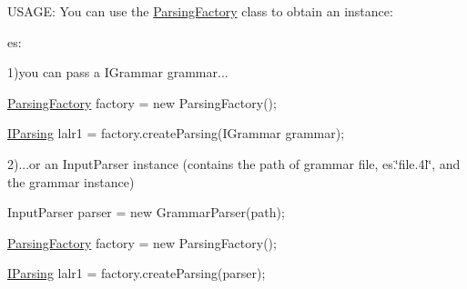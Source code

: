 U\-S\-A\-G\-E\-: You can use the \hyperlink{classcontext_free_1_1parser_1_1_parsing_factory}{Parsing\-Factory} class to obtain an instance\-:\par
 es\-:\par
 1)you can pass a I\-Grammar grammar...\par
 \hyperlink{classcontext_free_1_1parser_1_1_parsing_factory}{Parsing\-Factory} factory = new Parsing\-Factory();\par
 \hyperlink{interfacecontext_free_1_1parser_1_1_i_parsing}{I\-Parsing} lalr1 = factory.\-create\-Parsing(\-I\-Grammar grammar);\par
 \par
 2)...or an Input\-Parser instance (contains the path of grammar file, es.\char`\"{}file.\-4l\char`\"{}, and the grammar instance)\par


Input\-Parser parser = new Grammar\-Parser(path);\par
 \hyperlink{classcontext_free_1_1parser_1_1_parsing_factory}{Parsing\-Factory} factory = new Parsing\-Factory();\par
 \hyperlink{interfacecontext_free_1_1parser_1_1_i_parsing}{I\-Parsing} lalr1 = factory.\-create\-Parsing(parser);\par
 
